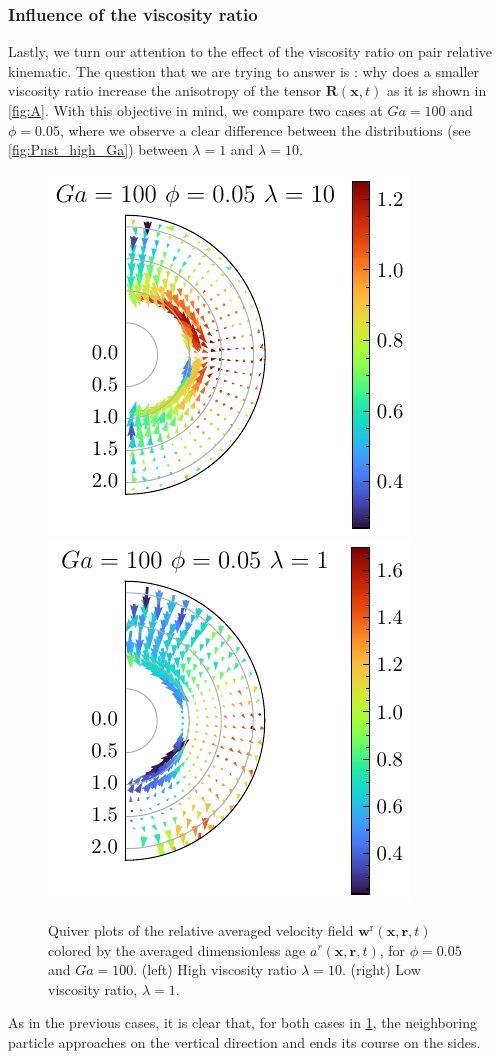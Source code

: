 \subsubsection{Influence of the viscosity ratio}

Lastly, we turn our attention to the effect of the viscosity ratio on pair relative kinematic.
The question that we are trying to answer is : why does a smaller viscosity ratio increase the anisotropy of the tensor $\textbf{R}(\textbf{x},t)$ as it is shown in \ref{fig:A}. 
With this objective in mind, we compare two cases at $Ga = 100$ and $\phi =0.05$, where we observe a clear difference between the distributions (see \ref{fig:Pnst_high_Ga}) between $\lambda = 1$ and $\lambda = 10$.
\begin{figure}[h!]
    \centering
    \includegraphics[height=0.35\textwidth]{image/HOMOGENEOUS_NEW/Dist/U_rel_l_10_Ga_100_PHI_5.pdf}
    \includegraphics[height=0.35\textwidth]{image/HOMOGENEOUS_NEW/Dist/U_rel_l_1_Ga_100_PHI_5.pdf}
    \caption{Quiver plots of the relative averaged velocity field $\textbf{w}^\text{r}(\textbf{x},\textbf{r},t)$ colored by the averaged dimensionless age $a^r(\textbf{x},\textbf{r},t)$, for $\phi = 0.05$ and $Ga = 100$. 
    (left) High viscosity ratio $\lambda = 10$.
    (right) Low viscosity ratio, $\lambda = 1$. }
    \label{fig:Why_l_matter}
\end{figure}
As in the previous cases, it is clear that, for both cases in \ref{fig:Why_l_matter}, the neighboring particle approaches on the vertical direction and ends its course on the sides.
